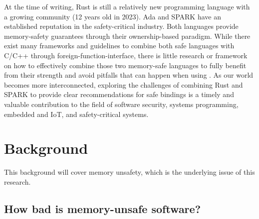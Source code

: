 \documentclass[nomenclature, english, bibtex]{kththesis}
\newcommand*{\generalExpl}[1]{\todo[inline]{#1}}
\begin{document}
At the time of writing, Rust is still a relatively new programming language with a growing community (12 years old in 2023). Ada and SPARK have an established reputation in the safety-critical industry. Both languages provide \gls{memory-safety} guarantees through their \gls{ownership}-based paradigm. While there exist many frameworks and guidelines to combine both safe languages with C/C++ through \gls{foreign-function-interface}, there is little research or framework on how to effectively combine those two memory-safe languages to fully benefit from their strength and avoid pitfalls that can happen when using . As our world becomes more interconnected, exploring the challenges of combining Rust and SPARK to provide clear recommendations for safe bindings is a timely and valuable contribution to the field of software security, systems programming, embedded and \gls{IoT}, and \gls{safety-critical} systems.


\section{Background}
\label{sec:background}
This background will cover memory unsafety, which is the underlying issue of this research.


\subsection{How bad is memory-unsafe software?}
\label{sec:sizeOfProblem}

\end{document}
